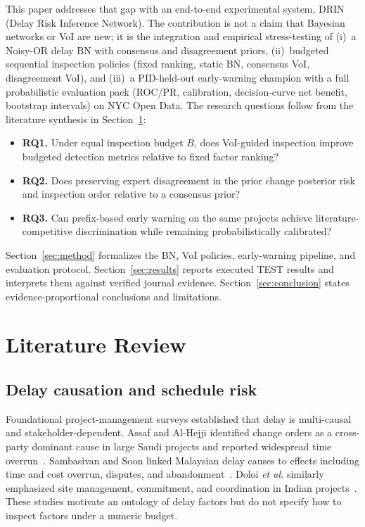 \documentclass[journal]{IEEEtran}
\begin{document}
This paper addresses that gap with an end-to-end experimental system, DRIN (Delay Risk Inference Network). The contribution is not a claim that Bayesian networks or VoI are new; it is the integration and empirical stress-testing of (i)~a Noisy-OR delay BN with consensus and disagreement priors, (ii)~budgeted sequential inspection policies (fixed ranking, static BN, consensus VoI, disagreement VoI), and (iii)~a PID-held-out early-warning champion with a full probabilistic evaluation pack (ROC/PR, calibration, decision-curve net benefit, bootstrap intervals) on NYC Open Data. The research questions follow from the literature synthesis in Section~\ref{sec:lit}:

\begin{itemize}
\item \textbf{RQ1.} Under equal inspection budget $B$, does VoI-guided inspection improve budgeted detection metrics relative to fixed factor ranking?
\item \textbf{RQ2.} Does preserving expert disagreement in the prior change posterior risk and inspection order relative to a consensus prior?
\item \textbf{RQ3.} Can prefix-based early warning on the same projects achieve literature-competitive discrimination while remaining probabilistically calibrated?
\end{itemize}



Section~\ref{sec:method} formalizes the BN, VoI policies, early-warning pipeline, and evaluation protocol. Section~\ref{sec:results} reports executed TEST results and interprets them against verified journal evidence. Section~\ref{sec:conclusion} states evidence-proportional conclusions and limitations.

\section{Literature Review}
\label{sec:lit}

\subsection{Delay causation and schedule risk}
Foundational project-management surveys established that delay is multi-causal and stakeholder-dependent. Assaf and Al-Hejji identified change orders as a cross-party dominant cause in large Saudi projects and reported widespread time overrun~\cite{Assaf2006}. Sambasivan and Soon linked Malaysian delay causes to effects including time and cost overrun, disputes, and abandonment~\cite{Sambasivan2007}. Doloi \textit{et al.} similarly emphasized site management, commitment, and coordination in Indian projects~\cite{Doloi2012}. These studies motivate an ontology of delay factors but do not specify how to inspect factors under a numeric budget.
\end{document}
